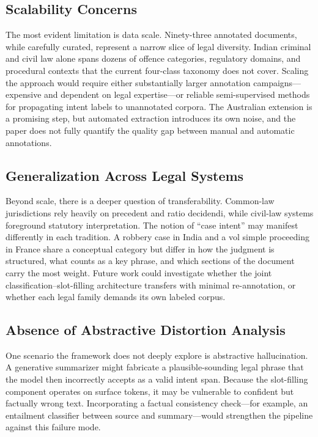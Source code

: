 \documentclass[conference]{IEEEtran}
\begin{document}
\subsection{Scalability Concerns}
The most evident limitation is data scale. Ninety-three annotated documents, while carefully curated, represent a narrow slice of legal diversity. Indian criminal and civil law alone spans dozens of offence categories, regulatory domains, and procedural contexts that the current four-class taxonomy does not cover. Scaling the approach would require either substantially larger annotation campaigns---expensive and dependent on legal expertise---or reliable semi-supervised methods for propagating intent labels to unannotated corpora. The Australian extension is a promising step, but automated extraction introduces its own noise, and the paper does not fully quantify the quality gap between manual and automatic annotations.

\subsection{Generalization Across Legal Systems}
Beyond scale, there is a deeper question of transferability. Common-law jurisdictions rely heavily on precedent and ratio decidendi, while civil-law systems foreground statutory interpretation. The notion of ``case intent'' may manifest differently in each tradition. A robbery case in India and a vol simple proceeding in France share a conceptual category but differ in how the judgment is structured, what counts as a key phrase, and which sections of the document carry the most weight. Future work could investigate whether the joint classification--slot-filling architecture transfers with minimal re-annotation, or whether each legal family demands its own labeled corpus.

\subsection{Absence of Abstractive Distortion Analysis}
One scenario the framework does not deeply explore is abstractive hallucination. A generative summarizer might fabricate a plausible-sounding legal phrase that the model then incorrectly accepts as a valid intent span. Because the slot-filling component operates on surface tokens, it may be vulnerable to confident but factually wrong text. Incorporating a factual consistency check---for example, an entailment classifier between source and summary---would strengthen the pipeline against this failure mode.
\end{document}
